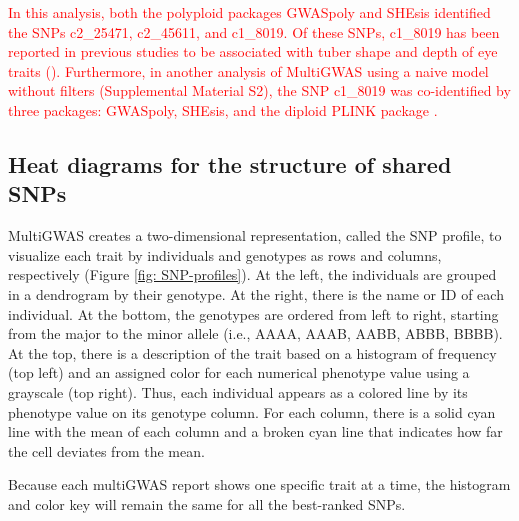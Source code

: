 \documentclass{article}
\begin{document}
\textcolor{red}{In this analysis, both the polyploid packages GWASpoly and SHEsis identified the SNPs c2\_25471, c2\_45611, and c1\_8019. Of these SNPs, c1\_8019 has been reported in previous studies to be associated with tuber shape and depth of eye traits (\cite{Rosyara2016, Sharma2018}). Furthermore, in another analysis of MultiGWAS using a naive model without filters (Supplemental Material S2), the SNP c1\_8019 was co-identified by three packages: GWASpoly, SHEsis, and the diploid PLINK package .}

\subsection{Heat diagrams for the structure of shared SNPs}

MultiGWAS creates a two-dimensional representation, called the SNP profile, to visualize each trait by individuals and genotypes as rows and columns, respectively (Figure \ref{fig: SNP-profiles}). At the left, the individuals are grouped in a dendrogram by their genotype. At the right, there is the name or ID of each individual. At the bottom, the genotypes are ordered from left to right, starting from the major to the minor allele (i.e., AAAA, AAAB, AABB, ABBB, BBBB). At the top, there is a description of the trait based on a histogram of frequency (top left) and an assigned color for each numerical phenotype value using a grayscale (top right). Thus, each individual appears as a colored line by its phenotype value on its genotype column. For each column, there is a solid cyan line with the mean of each column and a broken cyan line that indicates how far the cell deviates from the
mean.

Because each multiGWAS report shows one specific trait at a time, the histogram and color key will remain the same for all the best-ranked
SNPs.
\end{document}
